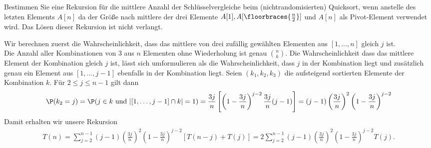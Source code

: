 
\begin{exercise}

Bestimmen Sie eine Rekursion für die mittlere Anzahl der Schlüsselvergleiche beim
(nichtrandomisierten) Quicksort, wenn anstelle des letzten Elements $A[n]$ da
der Größe nach mittlere der drei Elemente $A[1],A[\floorbraces{\frac{n}{2}}]$
und $A[n]$ als Pivot-Element verwendet wird. Das Lösen dieser Rekursion ist nicht
verlangt.

\end{exercise}



\begin{solution}

Wir berechnen zuerst die Wahrscheinlichkeit, dass das mittlere von drei zufällig
gewählten Elementen aus $[1,\dots,n]$ gleich $j$ ist. \\
Die Anzahl aller Kombinationen von $3$ aus $n$ Elementen ohne Wiederholung ist genau $\binom{n}{k}$.
Die Wahrscheinlichkeit dass das mittlere Element der Kombination gleich $j$ ist,
lässt sich umformulieren als die Wahrscheinlichkeit, dass $j$ in der Kombination liegt
und zusätzlich genau ein Element aus $[1,\dots,j-1]$ ebenfalls in der Kombination liegt.
Seien $(k_1,k_2,k_3)$ die aufsteigend sortierten Elemente der Kombination $k$.
Für $2 \leq j \leq n - 1$ gilt dann
\begin{align*}
  \P(k_2 = j) = \P(j \in k \text{ und } |[1,\dots,j-1]\cap k| = 1)
  = \frac{3j}{n}\left[\left(1- \frac{3j}{n}\right)^{j-2}\frac{3j}{n}(j-1)\right]
  =(j-1)\left(\frac{3j}{n}\right)^{2}\left(1- \frac{3j}{n}\right)^{j-2}
\end{align*}
Damit erhalten wir unsere Rekursion
\begin{align*}
  T(n) = \sum_{j=2}^{n-1}(j-1)\left(\frac{3j}{n}\right)^{2}\left(1- \frac{3j}{n}\right)^{j-2}[T(n-j) + T(j)] = 2\sum_{j=2}^{n-1}(j-1)\left(\frac{3j}{n}\right)^{2}\left(1- \frac{3j}{n}\right)^{j-2} T(j).
\end{align*}
\end{solution}

